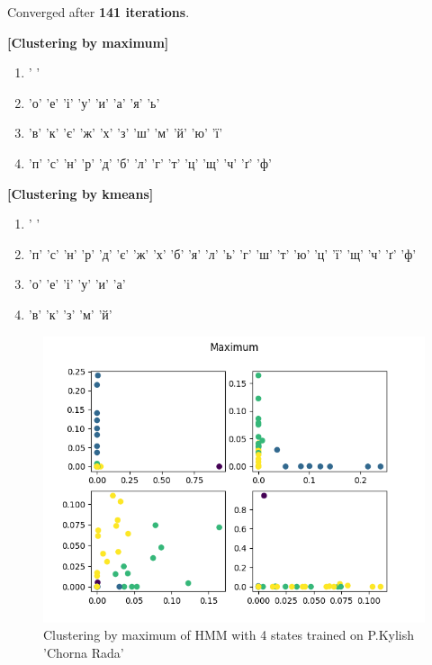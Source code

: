 \documentclass[12pt,a4paper]{article}
\begin{document}
  Converged after \textbf{141 iterations}.

  \textbf{[Clustering by maximum]}
  \begin{enumerate}
    \item ' '
    \item 'о' 'е' 'і' 'у' 'и' 'а' 'я' 'ь'
    \item 'в' 'к' 'є' 'ж' 'х' 'з' 'ш' 'м' 'й' 'ю' 'ї'
    \item 'п' 'с' 'н' 'р' 'д' 'б' 'л' 'г' 'т' 'ц' 'щ' 'ч' 'ґ' 'ф'
  \end{enumerate}

  \textbf{[Clustering by kmeans]}
  \begin{enumerate}
    \item ' '
    \item 'п' 'с' 'н' 'р' 'д' 'є' 'ж' 'х' 'б' 'я' 'л' 'ь' 'г' 'ш' 'т' 'ю' 'ц' 'ї'
 'щ' 'ч' 'ґ' 'ф'
    \item 'о' 'е' 'і' 'у' 'и' 'а'
    \item 'в' 'к' 'з' 'м' 'й'
  \end{enumerate}

  \begin{figure}[h]
    \includegraphics[width=\textwidth]{../plots/kylish-chorna-rada-clustering-4-max-1671021354.520232.png}
    \centering
    \caption{Clustering by maximum of HMM with 4 states trained on P.Kylish 'Chorna Rada'}
  \end{figure}
\end{document}
